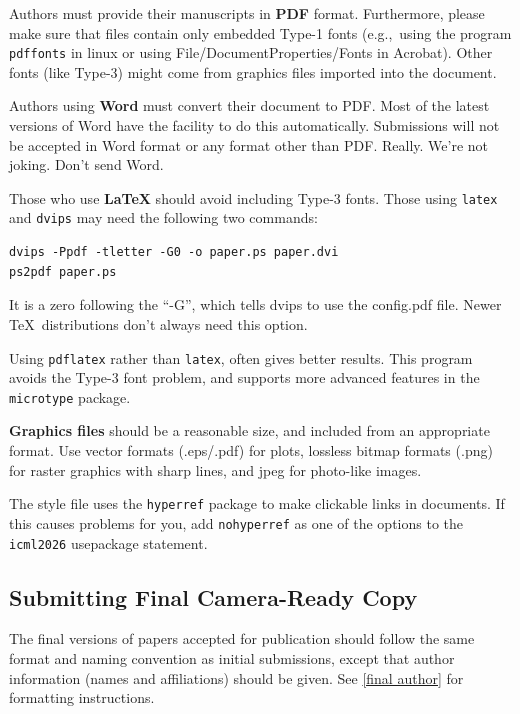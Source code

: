 \documentclass{article}
\theoremstyle{plain}
\theoremstyle{definition}
\theoremstyle{remark}
\begin{document}
\medskip

Authors must provide their manuscripts in \textbf{PDF} format.
Furthermore, please make sure that files contain only embedded Type-1 fonts
(e.g.,~using the program \texttt{pdffonts} in linux or using
File/DocumentProperties/Fonts in Acrobat). Other fonts (like Type-3)
might come from graphics files imported into the document.

Authors using \textbf{Word} must convert their document to PDF\@. Most
of the latest versions of Word have the facility to do this
automatically. Submissions will not be accepted in Word format or any
format other than PDF\@. Really. We're not joking. Don't send Word.

Those who use \textbf{\LaTeX} should avoid including Type-3 fonts.
Those using \texttt{latex} and \texttt{dvips} may need the following
two commands:

{\footnotesize
\begin{verbatim}
dvips -Ppdf -tletter -G0 -o paper.ps paper.dvi
ps2pdf paper.ps
\end{verbatim}}
It is a zero following the ``-G'', which tells dvips to use
the config.pdf file. Newer \TeX\ distributions don't always need this
option.

Using \texttt{pdflatex} rather than \texttt{latex}, often gives better
results. This program avoids the Type-3 font problem, and supports more
advanced features in the \texttt{microtype} package.

\textbf{Graphics files} should be a reasonable size, and included from
an appropriate format. Use vector formats (.eps/.pdf) for plots,
lossless bitmap formats (.png) for raster graphics with sharp lines, and
jpeg for photo-like images.

The style file uses the \texttt{hyperref} package to make clickable
links in documents. If this causes problems for you, add
\texttt{nohyperref} as one of the options to the \texttt{icml2026}
usepackage statement.

\subsection{Submitting Final Camera-Ready Copy}

The final versions of papers accepted for publication should follow the
same format and naming convention as initial submissions, except that
author information (names and affiliations) should be given. See
\cref{final author} for formatting instructions.
\end{document}
